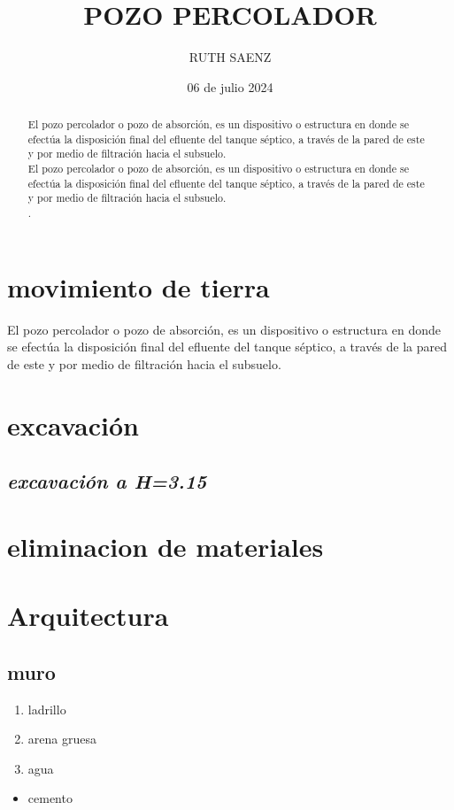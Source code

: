 \documentclass[a4paper,12pt,oneside]{article}%
\title{POZO PERCOLADOR}
\author{RUTH SAENZ}
\date{06 de julio 2024}
\begin{document}
\maketitle
\begin{abstract}
    El pozo percolador o pozo de absorción, es un dispositivo o estructura en donde se efectúa la disposición final del efluente del tanque séptico, a través de la pared de este y por medio de filtración hacia el subsuelo.\\%
 El pozo percolador o pozo de absorción, es un dispositivo o estructura en donde se efectúa la disposición final del efluente del tanque séptico, a través de la pared de este y por medio de filtración hacia el subsuelo.\\
 
 .
\end{abstract}
\section{\textbf{movimiento de tierra}}
  El pozo percolador o pozo de absorción, es un dispositivo o estructura en donde se efectúa la disposición final del efluente del tanque séptico, a través de la pared de este y por medio de filtración hacia el subsuelo.
\section{excavación}
\subsection{\textit{excavación a H=3.15}}
\section{eliminacion de materiales }
\section{Arquitectura}
\subsection{muro}
\begin{enumerate}
    \item ladrillo
    \item arena gruesa
    \item agua
\end{enumerate}
\begin{itemize}
    \item cemento
\end{itemize}
\end{document}
